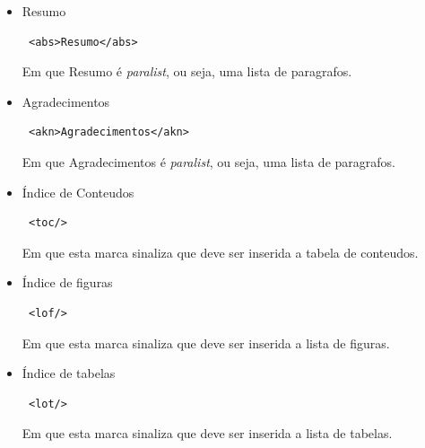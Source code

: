 \documentclass{report}
\begin{document}
\begin{itemize}
\item Resumo
\begin{verbatim} <abs>Resumo</abs> \end{verbatim} 
Em que Resumo é \textit{paralist}, ou seja, uma lista de paragrafos.
\item Agradecimentos
\begin{verbatim} <akn>Agradecimentos</akn> \end{verbatim} 
Em que Agradecimentos é \textit{paralist}, ou seja, uma lista de paragrafos.
\item Índice de Conteudos
\begin{verbatim} <toc/> \end{verbatim} 
Em que esta marca sinaliza que deve ser inserida a tabela de conteudos.
\item Índice de figuras
\begin{verbatim} <lof/> \end{verbatim} 
Em que esta marca sinaliza que deve ser inserida a lista de figuras.
\item Índice de tabelas
\begin{verbatim} <lot/> \end{verbatim} 
Em que esta marca sinaliza que deve ser inserida a lista de tabelas.
\end{itemize}
\end{document}
